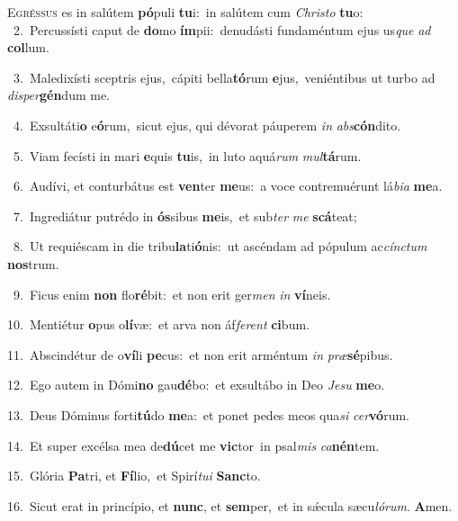 \lettrine{\initial\textcolor{\initialcolor}{E}}{gréssus} es in salútem \textbf{pó}\-puli \textbf{tu}\-i:~\star in salútem cum \textit{Chris}\-\textit{to} \textbf{tu}\-o:\\
{\numbfont\textcolor{\numbcolor}{~2.}}~Percussísti caput de \textbf{do}\-mo \textbf{ím}\-pii:~\star denudásti fundaméntum ejus us\textit{que} \textit{ad} \textbf{col}\-lum.\par
{\numbfont\textcolor{\numbcolor}{~3.}}~Maledixísti sceptris ejus,~\dagger cápiti bella\-\textbf{tó}\-rum \textbf{e}\-jus,~\star veniéntibus ut turbo ad \textit{di}\-\textit{sper}\textbf{gén}dum me.\par
{\numbfont\textcolor{\numbcolor}{~4.}}~Exsultáti\textbf{o} e\-\textbf{ó}\-rum,~\star sicut ejus, qui dévorat páuperem \textit{in} \textit{abs}\-\textbf{cón}dito.\par
{\numbfont\textcolor{\numbcolor}{~5.}}~Viam fecísti in mari \textbf{e}\-quis \textbf{tu}\-is,~\star in luto aquá\textit{rum} \textit{mul}\-\textbf{tá}rum.\par
{\numbfont\textcolor{\numbcolor}{~6.}}~Audívi, et conturbátus est \textbf{ven}\-ter \textbf{me}\-us:~\star a voce contremuérunt lá\-\textit{bi}\-\textit{a} \textbf{me}\-a.\par
{\numbfont\textcolor{\numbcolor}{~7.}}~Ingrediátur putrédo in \textbf{ós}\-sibus \textbf{me}\-is,~\star et sub\textit{ter} \textit{me} \textbf{scá}\-teat;\par
{\numbfont\textcolor{\numbcolor}{~8.}}~Ut requiéscam in die tribu\-\textbf{la}\-ti\-\textbf{ó}\-nis:~\star ut ascéndam ad pópulum ac\-\textit{cínc}\-\textit{tum} \textbf{nos}\-trum.\par
{\numbfont\textcolor{\numbcolor}{~9.}}~Ficus enim \textbf{non} flo\-\textbf{ré}\-bit:~\star et non erit ger\textit{men} \textit{in} \textbf{ví}\-neis.\par
{\numbfont\textcolor{\numbcolor}{10.}}~Mentiétur \textbf{o}\-pus o\-\textbf{lí}\-væ:~\star et arva non áf\-\textit{fe}\-\textit{rent} \textbf{ci}\-bum.\par
{\numbfont\textcolor{\numbcolor}{11.}}~Abscindétur de o\-\textbf{ví}\-li \textbf{pe}\-cus:~\star et non erit arméntum \textit{in} \textit{præ}\-\textbf{sé}pibus.\par
{\numbfont\textcolor{\numbcolor}{12.}}~Ego autem in Dómi\textbf{no} gau\-\textbf{dé}\-bo:~\star et exsultábo in Deo \textit{Je}\-\textit{su} \textbf{me}\-o.\par
{\numbfont\textcolor{\numbcolor}{13.}}~Deus Dóminus forti\-\textbf{tú}\-do \textbf{me}\-a:~\star et ponet pedes meos qua\textit{si} \textit{cer}\-\textbf{vó}rum.\par
{\numbfont\textcolor{\numbcolor}{14.}}~Et super excélsa mea de\-\textbf{dú}\-cet me \textbf{vic}\-tor~\star in psal\textit{mis} \textit{ca}\-\textbf{nén}tem.\par
{\numbfont\textcolor{\numbcolor}{15.}}~Glória \textbf{Pa}\-tri, et \textbf{Fí}\-lio,~\star et Spirí\-\textit{tu}\-\textit{i} \textbf{Sanc}\-to.\par
{\numbfont\textcolor{\numbcolor}{16.}}~Sicut erat in princípio, et \textbf{nunc}\-, et \textbf{sem}\-per,~\star et in sǽcula sæcu\-\textit{ló}\-\textit{rum}. \textbf{A}\-men.\par
